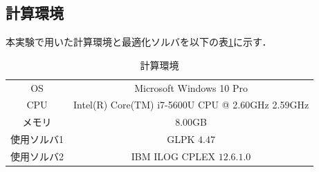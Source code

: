 \documentclass[a4paper,12pt,fleqn]{jarticle}
\begin{document}
\subsection{計算環境}
本実験で用いた計算環境と最適化ソルバを以下の表\ref{tb:1}に示す．
\begin{table}[H]
  \begin{center}
    \caption{計算環境}\label{tb:1}
    \begin{tabular}{cc} \toprule
      OS & Microsoft Windows 10 Pro \\
      CPU & Intel(R) Core(TM) i7-5600U CPU @ 2.60GHz 2.59GHz\\
      メモリ & 8.00GB \\
      使用ソルバ1 & GLPK $4.47$ \\
      使用ソルバ2 & IBM ILOG CPLEX $12.6.1.0$ \\ \bottomrule
    \end{tabular}
  \end{center}
\end{table}
\end{document}
